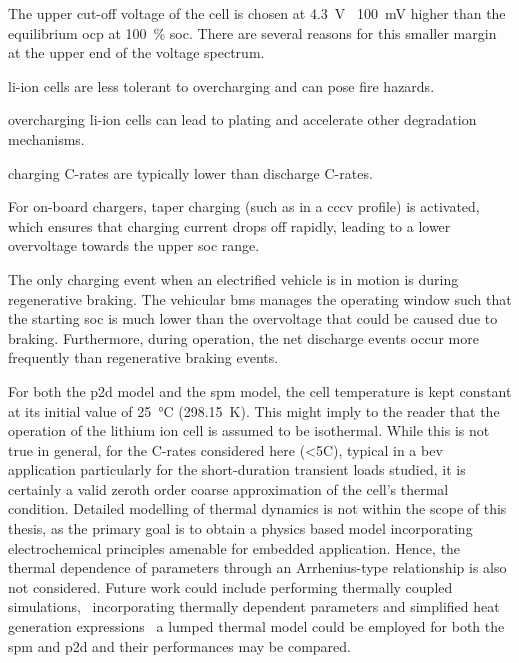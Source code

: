 The  upper   cut-off  voltage   of  the  cell   is  chosen   at  \SI{4.3}{\volt}
\ie~\approx\SI{100}{\milli\volt} higher  than  the  equilibrium \gls{ocp}  at
\SI{100}{\percent} \gls{soc}. There are several  reasons for this smaller margin
at the upper end of the voltage spectrum.
\begin{description}[leftmargin=!,labelwidth=\widthof{\bfseries low
    probabilities},itemsep=1ex]

\item[safety] li-ion  cells are less  tolerant to overcharging and  can pose
    fire hazards.

\item[degradation]  overcharging  li-ion  cells  can  lead  to  plating  and
    accelerate other degradation mechanisms.

\item[low  C-rates]  charging C-rates  are  typically  lower than  discharge
    C-rates.

\item[CCCV charging]  For on-board  chargers, taper charging  (such as  in a
    \gls{cccv} profile) is activated, which  ensures that charging current drops
    off  rapidly, leading  to a  lower overvoltage  towards the  upper \gls{soc}
    range.

\item[low probabilities] The only charging event when an electrified vehicle
    is in motion is during regenerative braking. The vehicular \gls{bms} manages
    the operating window such that the starting \gls{soc} is much lower than the
    overvoltage  that  could  be  caused due  to  braking.  Furthermore,  during
    operation, the net discharge events  occur more frequently than regenerative
    braking events.

\end{description}

For  both the  \gls{p2d} model  and the  \gls{spm} model,  the cell  temperature
is   kept   constant   at   its   initial   value   of   \SI{25}{\degreeCelsius}
(\SI{298.15}{\kelvin}). This might imply to the reader that the operation of the
lithium ion cell is assumed to be isothermal. While this is not true in general,
for  the C-rates  considered  here  (<5C), typical  in  a \gls{bev}  application
particularly for the  short-duration transient loads studied, it  is certainly a
valid  zeroth  order  coarse  approximation of  the  cell's  thermal  condition.
Detailed  modelling  of  thermal  dynamics  is not  within  the  scope  of  this
thesis, as  the primary goal  is to obtain  a physics based  model incorporating
electrochemical principles amenable for embedded application. Hence, the thermal
dependence  of parameters  through an  Arrhenius-type relationship  is also  not
considered. Future work could  include performing thermally coupled simulations,
\ie~incorporating   thermally  dependent   parameters  and   simplified  heat
generation expressions \eg~a lumped thermal  model could be employed for both
the \gls{spm} and \gls{p2d} and their performances may be compared.

